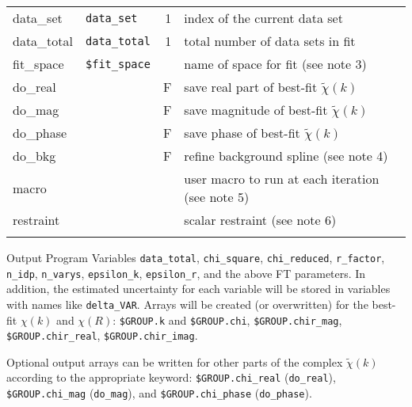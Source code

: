 \begin{IFFcom}
\begin{tabular}{llrl}
\noalign{\smallskip}
  {data\_set}   & {\tt{data\_set}} & 1 & index of the current data set  \\ 
  {data\_total} & {\tt{data\_total}} & 1 &  total number of data sets in fit \\ 
 \noalign{\smallskip}
  fit\_space  & {\tt{\$fit\_space}} &  & name of space for fit (see note 3)\\
  do\_real    &  & F & save real part of best-fit $\tilde\chi(k)$ \\
  do\_mag     &  & F & save magnitude of best-fit $\tilde\chi(k)$ \\
  do\_phase   &  & F & save phase of best-fit $\tilde\chi(k)$ \\
 \noalign{\smallskip}
  {do\_bkg}   &  & F & refine background spline (see note 4)  \\ 
  {macro}     &  &   & user macro to run at each iteration (see note 5)\\
  {restraint} &  &   & scalar restraint (see note 6)\\
  \noalign{\smallskip}
\end{tabular}
\noindent

\item[Output Program Variables] {\tt{data\_total}}, {\tt{chi\_square}},
  {\tt{chi\_reduced}}, {\tt{r\_factor}}, {\tt{n\_idp}}, {\tt{n\_varys}},
  {\tt{epsilon\_k}}, {\tt{epsilon\_r}}, and the above FT parameters.  In
  addition, the estimated uncertainty for each variable will be stored in
  variables with names like {\tt{delta\_VAR}}.  Arrays will be created (or
  overwritten) for the best-fit $\chi(k)$ and $\chi(R)$: {\tt{\$GROUP.k}}
  and {\tt{\$GROUP.chi}}, {\tt{\$GROUP.chir\_mag}},
  {\tt{\$GROUP.chir\_real}}, {\tt{\$GROUP.chir\_imag}}.

  Optional output arrays can be written for other parts of the complex
  $\tilde\chi(k)$ according to the appropriate keyword:
  {\tt{\$GROUP.chi\_real}} ({\tt{do\_real}}), 
  {\tt{\$GROUP.chi\_mag}}  ({\tt{do\_mag}}), and 
  {\tt{\$GROUP.chi\_phase}}  ({\tt{do\_phase}}).
  

\end{IFFcom}
